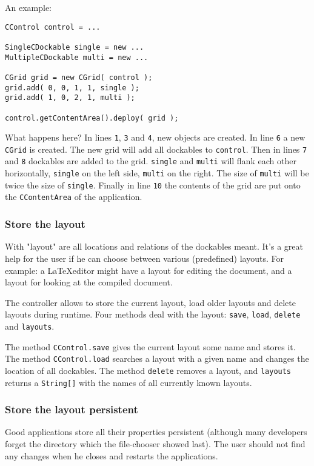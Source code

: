 \documentclass[a4paper,10pt]{article}
\newcommand{\src}[1]{\lstinline[basicstyle=\ttfamily]|#1|}
\begin{document}
An example:
\begin{lstlisting}
CControl control = ...

SingleCDockable single = new ...
MultipleCDockable multi = new ...

CGrid grid = new CGrid( control );
grid.add( 0, 0, 1, 1, single );
grid.add( 1, 0, 2, 1, multi );

control.getContentArea().deploy( grid );
\end{lstlisting}
What happens here? In lines \src{1}, \src{3} and \src{4}, new objects are created. In line \src{6} a new \src{CGrid} is created. The new grid will add all dockables to \src{control}. Then in lines \src{7} and \src{8} dockables are added to the grid. \src{single} and \src{multi} will flank each other horizontally, \src{single} on the left side, \src{multi} on the right. The size of \src{multi} will be twice the size of \src{single}. Finally in line \src{10} the contents of the grid are put onto the \src{CContentArea} of the application.

\subsubsection{Store the layout}
With "layout" are all locations and relations of the dockables meant. It's a great help for the user if he can choose between various (predefined) layouts. For example: a \LaTeX editor might have a layout for editing the document, and a layout for looking at the compiled document.

The controller allows to store the current layout, load older layouts and delete layouts during runtime. Four methods deal with the layout: \src{save}, \src{load}, \src{delete} and \src{layouts}.

The method \src{CControl.save} gives the current layout some name and stores it. The method \src{CControl.load} searches a layout with a given name and changes the location of all dockables. The method \src{delete} removes a layout, and \src{layouts} returns a \src{String[]} with the names of all currently known layouts.

\subsubsection{Store the layout persistent}
Good applications store all their properties persistent (although many developers forget the directory which the file-chooser showed last). The user should not find any changes when he closes and restarts the applications.
\end{document}
